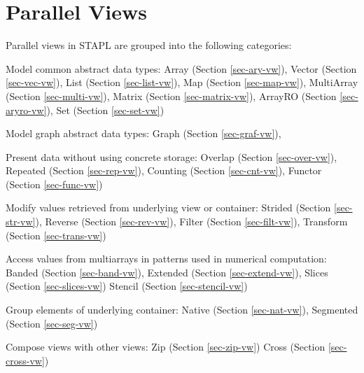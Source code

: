 \chapter{Parallel Views}

Parallel views in STAPL are grouped into the following categories:
\vspace{0.4cm}

Model common abstract data types:
\newline
Array (Section \ref{sec-ary-vw}),
Vector (Section \ref{sec-vec-vw}),
List (Section \ref{sec-list-vw}),
Map (Section \ref{sec-map-vw}),
MultiArray (Section \ref{sec-multi-vw}),
Matrix (Section \ref{sec-matrix-vw}),
ArrayRO (Section \ref{sec-aryro-vw}),
Set (Section \ref{sec-set-vw})
\vspace{0.4cm}

Model graph abstract data types:
\newline
Graph (Section \ref{sec-graf-vw}),
\vspace{0.4cm}

Present data without using concrete storage:
\newline
Overlap (Section \ref{sec-over-vw}),
Repeated (Section \ref{sec-rep-vw}),
Counting (Section \ref{sec-cnt-vw}),
Functor (Section \ref{sec-func-vw})
\vspace{0.4cm}

Modify values retrieved from underlying view or container:
\newline
Strided (Section \ref{sec-str-vw}),
Reverse (Section \ref{sec-rev-vw}),
Filter (Section \ref{sec-filt-vw}),
Transform (Section \ref{sec-trans-vw})
\vspace{0.4cm}

Access values from multiarrays in patterns used in numerical computation:
\newline
Banded (Section \ref{sec-band-vw}),
Extended (Section \ref{sec-extend-vw}),
Slices (Section \ref{sec-slices-vw})
Stencil (Section \ref{sec-stencil-vw})
\vspace{0.4cm}

Group elements of underlying container:
\newline
Native (Section \ref{sec-nat-vw}),
Segmented (Section \ref{sec-seg-vw})
\vspace{0.4cm}

Compose views with other views:
\newline
Zip (Section \ref{sec-zip-vw})
Cross (Section \ref{sec-cross-vw})
\vspace{0.4cm}

